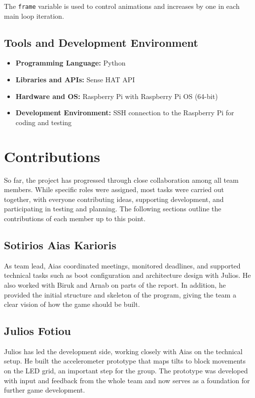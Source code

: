 \documentclass[11pt,titlepage,openright]{book}
\begin{document}
The \texttt{frame} variable is used to control animations and increases by one in each main loop iteration.

\section{Tools and Development Environment}
\begin{itemize}
    \item \textbf{Programming Language:} Python
    \item \textbf{Libraries and APIs:} Sense HAT API
    \item \textbf{Hardware and OS:} Raspberry Pi with Raspberry Pi OS (64-bit)
    \item \textbf{Development Environment:} SSH connection to the Raspberry Pi for coding and testing
\end{itemize}


\chapter{Contributions}
So far, the project has progressed through close collaboration among all team members. While specific roles were assigned, most tasks were carried out together, with everyone contributing ideas, supporting development, and participating in testing and planning. The following sections outline the contributions of each member up to this point.
\section{Sotirios Aias Karioris}
As team lead, Aias coordinated meetings, monitored deadlines, and supported technical tasks such as boot configuration and architecture design with Julios. He also worked with Biruk and Arnab on parts of the report. In addition, he provided the initial structure and skeleton of the program, giving the team a clear vision of how the game should be built.

\section{Julios Fotiou}
Julios has led the development side, working closely with Aias on the technical setup. He built the accelerometer prototype that maps tilts to block movements on the LED grid, an important step for the group. The prototype was developed with input and feedback from the whole team and now serves as a foundation for further game development.
\end{document}
